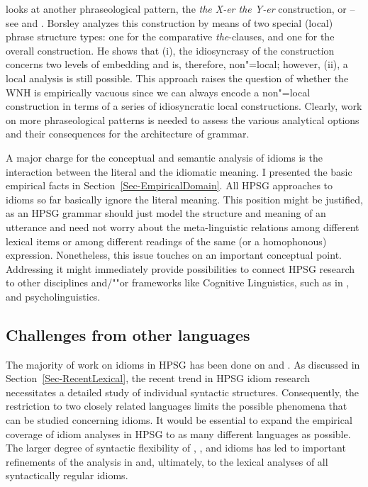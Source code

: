\documentclass[output=paper
 	        ,biblatex
                ,babelshorthands
                ,newtxmath
                ,draftmode
                ,colorlinks, citecolor=brown
]{langscibook}
\begin{document}
\citet{Borsley2004a} looks at another phraseological pattern, the \emph{the X-er the Y-er}
construction, or \emph{} -- see
 and
\crossrefchapterw[\pageref{udc:page-correlatives-start}--\pageref{udc:page-correlatives-end}]{udc}.
Borsley analyzes this construction by means of two special (local) phrase structure types: one for
the comparative \emph{the}-clauses, and one for the overall construction. He shows that (i), the
idiosyncrasy of the construction concerns two levels of embedding and is, therefore, non"=local;
however, (ii), a local analysis is still possible. This approach raises the question of whether the
WNH is empirically vacuous since we can always encode a non"=local construction in terms of a series
of idiosyncratic local constructions.  Clearly, work on more phraseological patterns is needed to
assess the various analytical options and their consequences for the architecture of grammar.

A major charge for the conceptual and semantic analysis of idioms is the interaction between the
literal and the idiomatic meaning.  I presented the basic empirical facts in
Section~\ref{Sec-EmpiricalDomain}.  All HPSG approaches to idioms so far basically ignore the
literal meaning.  This position might be justified, as an HPSG grammar should just model the
structure and meaning of an utterance and need not worry about the meta-linguistic relations among
different lexical items or among different readings of the same (or a homophonous) expression.
Nonetheless, this issue touches on an important conceptual point.  Addressing it might immediately
provide possibilities to connect HPSG research to other disciplines and/""or frameworks like
Cognitive Linguistics, such as in \citet{Dobrovolskij:Piirainen:05}, and psycholinguistics.



\subsection{Challenges from other languages}
\label{Sec-OtherLanguages}

The majority of work on idioms in HPSG has been done on  and . 
As discussed in Section~\ref{Sec-RecentLexical}, the recent trend in HPSG idiom research necessitates a detailed study of individual syntactic structures. 
Consequently, the restriction to two closely related languages limits the possible phenomena that can be studied concerning idioms. 
It would be essential to expand the empirical coverage of idiom analyses in HPSG to as many different languages as possible. 
The larger degree of syntactic flexibility of , , and  idioms \citep{Ruwet:91,NSW94a,Schenk:95} has led to important refinements of the analysis in \citet{NSW94a} and, ultimately, to the lexical analyses of all syntactically regular idioms. 
\end{document}
